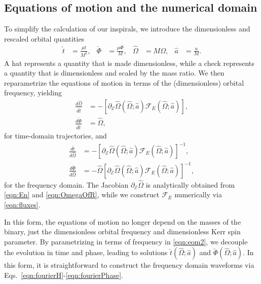 \documentclass[%
 reprint,
 nofootinbib,
 amsmath,amssymb,
 aps,
 prd,
]{revtex4-2}
\begin{document}
\subsection{Equations of motion and the numerical domain}
\label{sec:eom}

To simplify the calculation of our inspirals, we introduce the dimensionless and rescaled orbital quantities
\begin{align}
    \check{t} &= \frac{\mu t}{M^2},
    &
    \check{\Phi} &= \frac{\mu \Phi}{M},
    &
    \hat{\Omega} &= M \Omega,
    &
    \hat{a} &= \frac{a}{M}.
\end{align} 
A hat represents a quantity that is made dimensionless, while a check represents a quantity that is dimensionless and scaled by the mass ratio. We then reparametrize the equations of motion in terms of the (dimensionless) orbital frequency, yielding
\begin{subequations} \label{eqn:eom1}
\begin{align} \label{eqn:dtdOmega}
    \frac{d\hat{\Omega}}{d\check{t}} &= -\left[\partial_{\mathcal{E}}\hat{\Omega}(\hat{\Omega}; \hat{a}) {\mathcal{F}}_E(\hat{\Omega}; \hat{a})\right],
    \\ \label{eqn:dPhidOmega}
    \frac{d\check{\Phi}}{d\check{t}} &= \hat{\Omega},
\end{align} 
\end{subequations}
for time-domain trajectories, and 
\begin{subequations} \label{eqn:eom2}
\begin{align} \label{eqn:dtdOmega}
    \frac{d\check{t}}{d\hat{\Omega}} &= -\left[\partial_{\mathcal{E}}\hat{\Omega}(\hat{\Omega}; \hat{a}) {\mathcal{F}}_E(\hat{\Omega}; \hat{a})\right]^{-1},
    \\ \label{eqn:dPhidOmega}
    \frac{d\check{\Phi}}{d\hat{\Omega}} &= -\hat{\Omega} \left[\partial_{\mathcal{E}}\hat{\Omega}(\hat{\Omega}; \hat{a}) {\mathcal{F}}_E(\hat{\Omega}; \hat{a})\right]^{-1},
\end{align} 
\end{subequations}
for the frequency domain.
The Jacobian $\partial_{\mathcal{E}}\hat{\Omega}$ is analytically obtained from \eqref{eqn:En} and \eqref{eqn:OmegaOfR}, while we construct ${\mathcal{F}}_E$ numerically via \eqref{eqn:fluxes}.

In this form, the equations of motion no longer depend on the masses of the binary, just the dimensionless orbital frequency and dimensionless Kerr spin parameter. By parametrizing in terms of frequency in \eqref{eqn:eom2}, we decouple the evolution in time and phase, leading to solutions $\check{t}(\hat{\Omega}; \hat{a})$ and $\check{\Phi}(\hat{\Omega}; \hat{a})$. In this form, it is straightforward to construct the frequency domain waveforms via Eqs.~\eqref{eqn:fourierH}-\eqref{eqn:fourierPhase}.
\end{document}
